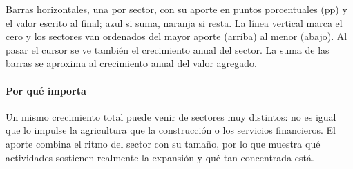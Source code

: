 \begin{leer}
Barras horizontales, una por sector, con su aporte en puntos porcentuales (pp) y el valor escrito al final; azul si suma, naranja si resta. La línea vertical marca el cero y los sectores van ordenados del mayor aporte (arriba) al menor (abajo). Al pasar el cursor se ve también el crecimiento anual del sector. La suma de las barras se aproxima al crecimiento anual del valor agregado.
\end{leer}

\paragraph{Por qué importa}
Un mismo crecimiento total puede venir de sectores muy distintos: no es igual que lo impulse la agricultura que la construcción o los servicios financieros. El aporte combina el ritmo del sector con su tamaño, por lo que muestra qué actividades sostienen realmente la expansión y qué tan concentrada está.

